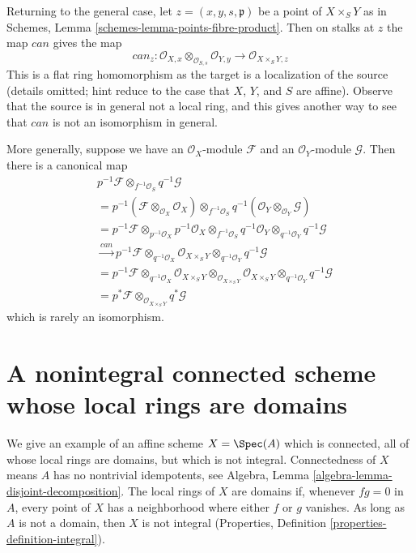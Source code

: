 \medskip\noindent
Returning to the general case, let $z = (x, y, s, \mathfrak p)$
be a point of $X \times_S Y$ as in
Schemes, Lemma \ref{schemes-lemma-points-fibre-product}.
Then on stalks at $z$ the map $can$ gives the map
$$
can_z :
\mathcal{O}_{X, x} \otimes_{\mathcal{O}_{S, s}} \mathcal{O}_{Y, y}
\longrightarrow
\mathcal{O}_{X \times_S Y, z}
$$
This is a flat ring homomorphism as the target is a localization of the
source (details omitted; hint reduce to the case that $X$, $Y$, and $S$
are affine).
Observe that the source is in general not a local ring, and this gives
another way to see that $can$ is not an isomorphism in general.

\medskip\noindent
More generally, suppose we have an $\mathcal{O}_X$-module $\mathcal{F}$ and an
$\mathcal{O}_Y$-module $\mathcal{G}$. Then there is a canonical map
\begin{align*}
& p^{-1}\mathcal{F} \otimes_{f^{-1}\mathcal{O}_S} q^{-1}\mathcal{G} \\
& =
p^{-1}(\mathcal{F} \otimes_{\mathcal{O}_X} \mathcal{O}_X)
\otimes_{f^{-1}\mathcal{O}_S}
q^{-1}(\mathcal{O}_Y \otimes_{\mathcal{O}_Y} \mathcal{G}) \\
& =
p^{-1}\mathcal{F} \otimes_{p^{-1}\mathcal{O}_X} p^{-1}\mathcal{O}_X
\otimes_{f^{-1}\mathcal{O}_S}
q^{-1}\mathcal{O}_Y \otimes_{q^{-1}\mathcal{O}_Y} q^{-1}\mathcal{G} \\
& \xrightarrow{can}
p^{-1}\mathcal{F} \otimes_{q^{-1}\mathcal{O}_X}
\mathcal{O}_{X \times_S Y}
\otimes_{q^{-1}\mathcal{O}_Y} q^{-1}\mathcal{G}  \\
& =
p^{-1}\mathcal{F} \otimes_{q^{-1}\mathcal{O}_X}
\mathcal{O}_{X \times_S Y}
\otimes_{\mathcal{O}_{X \times_S Y}}
\mathcal{O}_{X \times_S Y}
\otimes_{q^{-1}\mathcal{O}_Y} q^{-1}\mathcal{G}  \\
& =
p^*\mathcal{F} \otimes_{\mathcal{O}_{X \times_S Y}} q^*\mathcal{G}
\end{align*}
which is rarely an isomorphism.





\section{A nonintegral connected scheme whose local rings are domains}
\label{section-connected-locally-integral-not-integral}

\noindent
We give an example of an affine scheme $X = \Spec(A)$ which is
connected, all of whose local rings are domains, but which is not integral.
Connectedness of $X$ means $A$ has no nontrivial idempotents, see
Algebra, Lemma \ref{algebra-lemma-disjoint-decomposition}.
The local rings of $X$ are domains if, whenever $fg = 0$ in $A$, every
point of $X$ has a neighborhood where either $f$ or $g$ vanishes.
As long as $A$ is not a domain, then $X$ is not integral
(Properties, Definition \ref{properties-definition-integral}).

